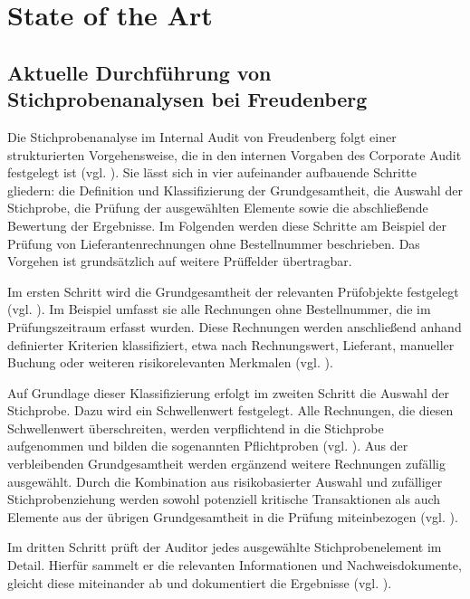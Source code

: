 \chapter{State of the Art}
\label{chap:stateoftheart}

\section{Aktuelle Durchführung von Stichprobenanalysen bei Freudenberg}
\label{sec:stichprobenanalyse_freudenberg}

Die Stichprobenanalyse im Internal Audit von Freudenberg folgt einer strukturierten Vorgehensweise, die in den internen Vorgaben des Corporate Audit festgelegt ist (vgl. \cite{freudenberg2026auditsample}). Sie lässt sich in vier aufeinander aufbauende Schritte gliedern: die Definition und Klassifizierung der Grundgesamtheit, die Auswahl der Stichprobe, die Prüfung der ausgewählten Elemente sowie die abschließende Bewertung der Ergebnisse. Im Folgenden werden diese Schritte am Beispiel der Prüfung von Lieferantenrechnungen ohne Bestellnummer beschrieben. Das Vorgehen ist grundsätzlich auf weitere Prüffelder übertragbar.

Im ersten Schritt wird die Grundgesamtheit der relevanten Prüfobjekte festgelegt (vgl. \cite[S.~12]{baumeister2019sample}). Im Beispiel umfasst sie alle Rechnungen ohne Bestellnummer, die im Prüfungszeitraum erfasst wurden. Diese Rechnungen werden anschließend anhand definierter Kriterien klassifiziert, etwa nach Rechnungswert, Lieferant, manueller Buchung oder weiteren risikorelevanten Merkmalen (vgl. \cite{freudenberg2026auditsample}).

Auf Grundlage dieser Klassifizierung erfolgt im zweiten Schritt die Auswahl der Stichprobe. Dazu wird ein Schwellenwert festgelegt. Alle Rechnungen, die diesen Schwellenwert überschreiten, werden verpflichtend in die Stichprobe aufgenommen und bilden die sogenannten Pflichtproben (vgl. \cite[S.~19 f.]{baumeister2019sample}). Aus der verbleibenden Grundgesamtheit werden ergänzend weitere Rechnungen zufällig ausgewählt. Durch die Kombination aus risikobasierter Auswahl und zufälliger Stichprobenziehung werden sowohl potenziell kritische Transaktionen als auch Elemente aus der übrigen Grundgesamtheit in die Prüfung miteinbezogen (vgl. \cite{freudenberg2026auditsample}).

Im dritten Schritt prüft der Auditor jedes ausgewählte Stichprobenelement im Detail. Hierfür sammelt er die relevanten Informationen und Nachweisdokumente, gleicht diese miteinander ab und dokumentiert die Ergebnisse (vgl. \cites[S.~17]{baumeister2019sample}{freudenberg2026auditsample}).


